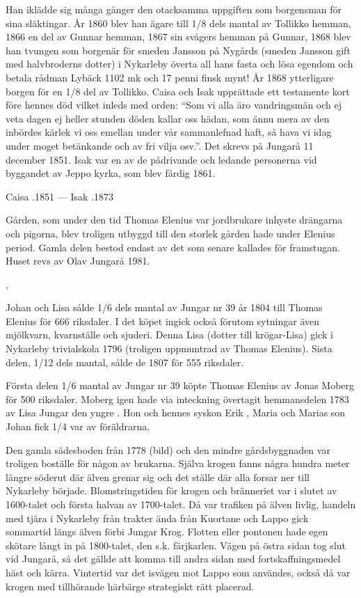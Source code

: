 Han iklädde sig många gånger den otacksamma uppgiften som borgensman för sina släktingar. År 1860 blev han ägare till 1/8 dels mantal av Tollikko hemman, 1866 en del av Gunnar hemman, 1867 sin svågers hemman på Gunnar, 1868 blev han tvungen 	som borgenär för smeden Jansson på 	Nygårds (smeden Jansson gift med halvbroderns dotter) i Nykarleby överta all hans 	fasta och lösa egendom och betala rådman Lybäck 1102 mk och 17 penni finsk mynt!	År 1868 ytterligare borgen för en 1/8 del av Tollikko. Caisa och Isak upprättade ett testamente kort före hennes död vilket inleds med orden: 	``Som vi alla äro vandringsmän och ej veta dagen ej heller stunden döden kallar oss hädan, som ännu mera av den inbördes kärlek vi oss emellan under vår sammanlefnad haft, så hava vi idag under moget betänkande och av fri vilja osv.''. Det skrevs på 	Jungarå 11 december 1851. Isak var en av de pådrivande och ledande personerna vid byggandet av Jeppo kyrka, som blev 	färdig 1861.

Caisa .1851  ---  Isak .1873

Gården, som under den tid Thomas Elenius var jordbrukare inhyste drängarna och pigorna, blev troligen utbyggd till den storlek gården hade under Elenius period. Gamla delen bestod endast av det som senare kallades för framstugan. Huset revs av Olav Jungarå 1981.



, 

Johan och Lisa sålde 1/6 dels mantal av Jungar nr 39 år 1804 till Thomas Elenius för 666 riksdaler. I det köpet ingick också förutom sytningar även mjölkvarn, kvarnställe och sjuderi. Denna Lisa (dotter till krögar-Lisa) gick i Nykarleby trivialskola 1796 (troligen uppmuntrad av Thomas Elenius). Sista delen, 1/12 dels mantal, sålde de 1807 för 555 riksdaler.

Första delen 1/6 mantal av Jungar nr 39 köpte Thomas Elenius av Jonas Moberg för 500 riksdaler. Moberg igen hade via 	inteckning övertagit hemmansdelen 1783 av Lisa Jungar den yngre . Hon och hennes syskon Erik , Maria  och Marias son Johan fick 1/4 var av föräldrarna.

Den gamla sädesboden från 1778 (bild) och den mindre gårdsbyggnaden var troligen boställe för någon av brukarna. Själva krogen fanns några hundra meter längre söderut där älven grenar sig och det ställe där alla forsar ner till Nykarleby började. Blomstringstiden för krogen och bränneriet var i slutet av 1600-talet och första halvan av 1700-talet. Då var trafiken på älven livlig, handeln med tjära i Nykarleby från trakter ända från Kuortane och Lappo gick sommartid längs älven förbi Jungar Krog. Flotten eller pontonen hade egen skötare långt in på 1800-talet, den s.k. färjkarlen. Vägen på östra sidan tog slut vid Jungarå, så det gällde att komma till andra sidan med fortskaffningsmedel häst och kärra. Vintertid var det isvägen mot Lappo som användes, också då var krogen med tillhörande härbärge strategiskt rätt placerad.

